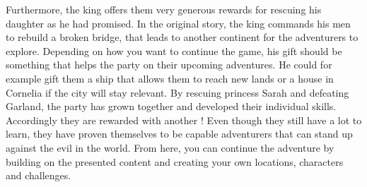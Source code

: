 Furthermore, the king offers them very generous rewards for rescuing his daughter as he had promised.
In the original story, the king commands his men to rebuild a broken bridge, that leads to another  continent for the adventurers to explore.
Depending on how you want to continue the game, his gift should be something that helps the party on their upcoming adventures.
He could for example gift them a ship that allows them to reach new lands or a house in Cornelia if the city will stay relevant.
By rescuing princess Sarah and defeating Garland, the party has grown together and developed their individual skills.
Accordingly they are rewarded with another !
Even though they still have a lot to learn, they have proven themselves to be capable adventurers that can stand up against the evil in the world.
From here, you can continue the adventure by building on the presented content and creating your own locations, characters and challenges.
%
\clearpage